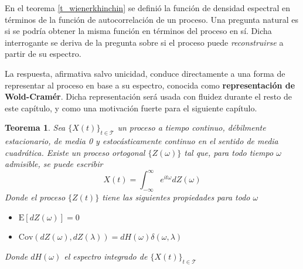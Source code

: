 \documentclass[12pt,letterpaper]{book}
\newtheorem{teorema}{Teorema}[chapter]
\newcommand{\intR}{\int_{-\infty}^{\infty}}
\newcommand{\E}[1]{\mathrm{E}\left[ #1 \right]}
\newcommand{\Cov}[1]{\mathrm{Cov}\left( #1 \right)}
\newcommand{\abso}[1]{\left| #1 \right|}
\newcommand{\xt}{$\{X(t)\}_{t\in \mathcal{T}}$ }
\begin{document}
En el teorema \ref{t_wienerkhinchin} se definió la función de densidad espectral en términos de la función de autocorrelación de un proceso.
%
Una pregunta natural es si se podría obtener la misma función en términos del proceso en sí.
%
Dicha interrogante se deriva de la pregunta sobre si el proceso puede \textit{reconstruirse} a partir de su espectro.

La respuesta, afirmativa salvo unicidad, conduce directamente a una forma de representar al proceso en base a su espectro, conocida como \textbf{representación de Wold-Cramér}.
%
Dicha representación será usada con fluidez durante el resto de este capítulo, y como una motivación fuerte para el siguiente capítulo.

\begin{teorema}
Sea \xt un proceso a tiempo continuo, débilmente estacionario, de media 0 y estocásticamente continuo en el sentido de media cuadrática. Existe un proceso ortogonal $\{Z(\omega)\}$ tal que, para todo tiempo $\omega$ admisible, se puede escribir
\begin{equation*}
X(t) = \intR e^{i t \omega} dZ(\omega)
\end{equation*}
Donde el proceso $\{Z(t)\}$ tiene las siguientes propiedades para todo $\omega$
\begin{itemize}
\item $\E{dZ(\omega)} = 0$
\item $\Cov{dZ(\omega),dZ(\lambda)} = dH(\omega) \delta(\omega, \lambda)$
\end{itemize}
Donde $dH(\omega)$ el espectro integrado de \xt
\label{rep_espectral}
\end{teorema}
\end{document}
